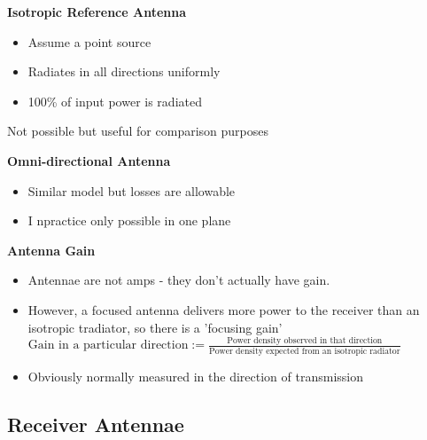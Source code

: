 \documentclass[12pt]{article}
\begin{document}
\textbf{Isotropic Reference Antenna}
\begin{itemize}[noitemsep]
    \item Assume a point source
    \item Radiates in all directions uniformly
    \item 100\% of input power is radiated
\end{itemize}
Not possible but useful for comparison purposes

\textbf{Omni-directional Antenna}
\begin{itemize}[noitemsep]
    \item Similar model but losses are allowable
    \item I npractice only possible in one plane
\end{itemize}

\textbf{Antenna Gain}
\begin{itemize}[noitemsep]
    \item Antennae are not amps - they don't actually have gain.
    \item However, a focused antenna delivers more power to the receiver than an isotropic tradiator, so there is a 'focusing gain'\\[1em]

    \begin{math}
    \text{Gain in a particular direction} := \frac{\text{Power density observed in that direction}}{\text{Power density expected from an isotropic radiator}}
    \end{math}\\[1em]

    \item Obviously normally measured in the direction of transmission
\end{itemize}

\subsection{Receiver Antennae}
\end{document}
